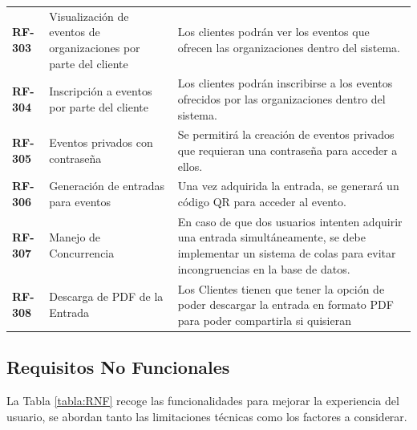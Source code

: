 \begin{longtable}{ p{2.5cm} p{4cm} p{9cm}  }
    \textbf{RF-303} & Visualización de eventos de organizaciones por parte del cliente & Los clientes podrán ver los eventos que ofrecen las organizaciones dentro del sistema.\\
    \textbf{RF-304} & Inscripción a eventos por parte del cliente & Los clientes podrán inscribirse a los eventos ofrecidos por las organizaciones dentro del sistema.\\
    \textbf{RF-305} & Eventos privados con contraseña & Se permitirá la creación de eventos privados que requieran una contraseña para acceder a ellos.\\
    \textbf{RF-306} & Generación de entradas para eventos & Una vez adquirida la entrada, se generará un código QR para acceder al evento.\\
    \textbf{RF-307} & Manejo de Concurrencia & En caso de que dos usuarios intenten adquirir una entrada simultáneamente, se debe implementar 
    un sistema de colas para evitar incongruencias en la base de datos. \\
    \textbf{RF-308} & Descarga de PDF de la Entrada & Los Clientes tienen que tener la opción de poder descargar la entrada en formato PDF para poder
    compartirla si quisieran\\
    \end{longtable}
    \newpage
    \subsection{Requisitos No Funcionales}
    La Tabla \ref{tabla:RNF} recoge las funcionalidades para mejorar la experiencia del usuario, se abordan tanto las limitaciones 
    técnicas como los factores a considerar.

